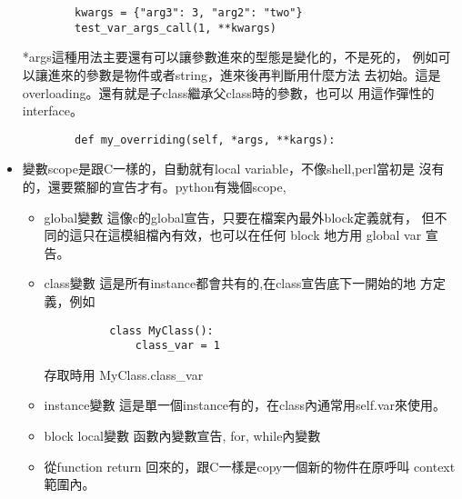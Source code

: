 \begin{itemize}
\begin{verbatim}
        kwargs = {"arg3": 3, "arg2": "two"}
        test_var_args_call(1, **kwargs)
        \end{verbatim}
	*args這種用法主要還有可以讓參數進來的型態是變化的，不是死的，
	例如可以讓進來的參數是物件或者string，進來後再判斷用什麼方法
	去初始。這是overloading。還有就是子class繼承父class時的參數，也可以
        用這作彈性的interface。
        \begin{verbatim}
        def my_overriding(self, *args, **kargs):
        \end{verbatim}
\item 變數scope是跟C一樣的，自動就有local variable，不像shell,perl當初是
	沒有的，還要鱉腳的宣告才有。python有幾個scope,
        \begin{itemize}
          \item global變數 這像c的global宣告，只要在檔案內最外block定義就有，
            但不同的這只在這模組檔內有效，也可以在任何 block 地方用 global var
            宣告。
        \item class變數 這是所有instance都會共有的,在class宣告底下一開始的地
          方定義，例如
          \begin{verbatim}
          class MyClass():
              class_var = 1	
          \end{verbatim}
          存取時用 MyClass.class\_var

        \item instance變數 這是單一個instance有的，在class內通常用self.var來使用。
        \item block local變數 函數內變數宣告, for, while內變數
        \item 從function return 回來的，跟C一樣是copy一個新的物件在原呼叫
          context範圍內。
        \end{itemize}


\end{itemize}

